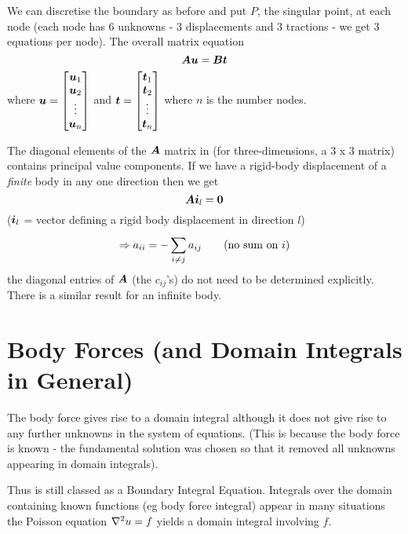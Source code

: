 We can discretise the boundary as before and put $P$, the singular point, at
each node (each node has $6$ unknowns - $3$ displacements and $3$ tractions - we get
$3$ equations per node). The overall matrix equation
\begin{equation}
  \matr{A}\vect{U}=\matr{B}\vect{T}
  \label{eqn:matrix}
\end{equation}
where $\vect{U} = 
\begin{bmatrix}
  \vect{u}_{1} \\ 
  \vect{u}_{2} \\ 
  \vdots \\ 
  \vect{u}_{n}
\end{bmatrix} $ and  $ \vect{t} = 
\begin{bmatrix}
  \vect{t}_{1} \\
  \vect{t}_{2} \\ 
  \vdots \\
  \vect{t}_{n}
\end{bmatrix}$ where $n$ is the number nodes.

The diagonal elements of the $\matr{A}$ matrix in  
(for three-dimensions, a $3$ x $3$
matrix) contains principal value components. If we have a rigid-body
displacement of a \emph{finite} body in any one direction then we get
\begin{equation*}
  \matr{A}\vect{I}_{l} = \vect{0}
\end{equation*}
($\vect{I}_{l}$ = vector defining a rigid body displacement in direction $l$)
\begin{displaymath}
    \Rightarrow a_{ii} = - \displaystyle\sum_{i\neq j}^{} a_{ij} \qquad \text{(no sum on $i$)} 
\end{displaymath} 
\ie the diagonal entries of $\matr{A}$ (the $c_{ij}$'s) do not need to be
determined explicitly. There is a similar result for an infinite body.

\section{Body Forces (and Domain Integrals in General)}

The body force gives rise to a domain integral although it does not give rise
to any further unknowns in the system of equations.  (This is because the body
force is known - the fundamental solution was chosen so that it removed all
unknowns appearing in domain integrals).

Thus  is still classed as a Boundary Integral Equation.
Integrals over the domain containing known functions (eg body force integral)
appear in many situations \eg the Poisson equation $\nabla^{2} {u}=f$ yields a
domain integral involving $f$.

